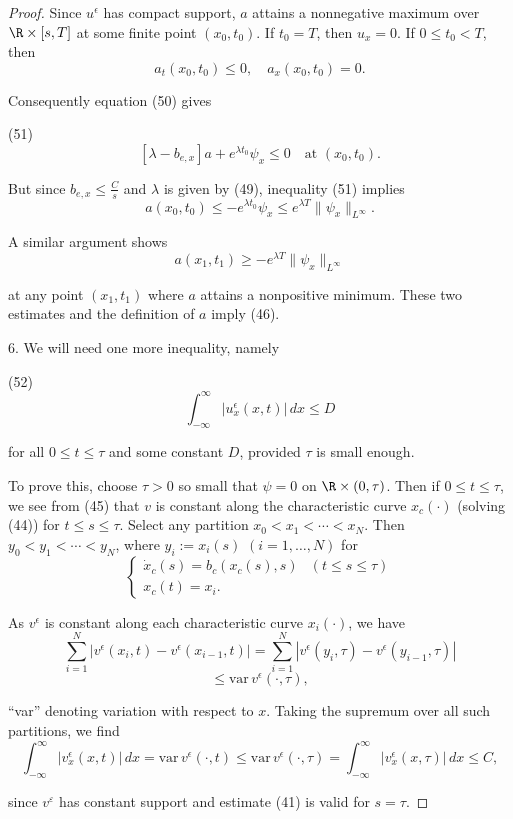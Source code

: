 \begin{proof}
Since $u^\epsilon$ has compact support, $a$ attains a nonnegative maximum over $\R \times [s,T]$ at some finite point $(x_0, t_0)$. If $t_0 = T$, then $u_x = 0$. If $0 \le t_0 < T$, then
$$a_t(x_0, t_0) \le 0, \quad a_x(x_0, t_0) = 0.$$

Consequently equation (50) gives

(51)
$$[\lambda - b_{e,x}]a + e^{\lambda t_0} \psi_x \le 0 \quad \text{at } (x_0, t_0).$$

But since $b_{e,x} \le \frac{C}{s}$ and $\lambda$ is given by (49), inequality (51) implies
$$a(x_0, t_0) \le -e^{\lambda t_0} \psi_x \le e^{\lambda T} \|\psi_x\|_{L^\infty}.$$

A similar argument shows
$$a(x_1, t_1) \ge -e^{\lambda T} \|\psi_x\|_{L^\infty}$$

at any point $(x_1, t_1)$ where $a$ attains a nonpositive minimum. These two estimates and the definition of $a$ imply (46).

6. We will need one more inequality, namely

(52)
$$\int_{-\infty}^{\infty} |u_x^\epsilon(x,t)| \, dx \le D$$

for all $0 \le t \le \tau$ and some constant $D$, provided $\tau$ is small enough.

To prove this, choose $\tau > 0$ so small that $\psi = 0$ on $\R \times (0, \tau)$. Then if $0 \le t \le \tau$, we see from (45) that $v$ is constant along the characteristic curve $x_c(\cdot)$ (solving (44)) for $t \le s \le \tau$. Select any partition $x_0 < x_1 < \cdots < x_N$. Then $y_0 < y_1 < \cdots < y_N$, where $y_i := x_i(s)$ $(i = 1, \ldots, N)$ for
$$\begin{cases}
\dot{x}_c(s) = b_c(x_c(s), s) & (t \le s \le \tau) \\
x_c(t) = x_i.
\end{cases}$$

As $v^\epsilon$ is constant along each characteristic curve $x_i(\cdot)$, we have
$$\sum_{i=1}^{N} |v^\epsilon(x_i, t) - v^\epsilon(x_{i-1}, t)| = \sum_{i=1}^{N} |v^\epsilon(y_i, \tau) - v^\epsilon(y_{i-1}, \tau)|$$
$$\le \text{var} \, v^\epsilon(\cdot, \tau),$$

``var'' denoting variation with respect to $x$. Taking the supremum over all such partitions, we find
$$\int_{-\infty}^{\infty} |v_x^\epsilon(x,t)| \, dx = \text{var} \, v^\epsilon(\cdot, t) \le \text{var} \, v^\epsilon(\cdot, \tau) = \int_{-\infty}^{\infty} |v_x^\epsilon(x, \tau)| \, dx \le C,$$

since $v^\varepsilon$ has constant support and estimate (41) is valid for $s = \tau$.


\end{proof}
